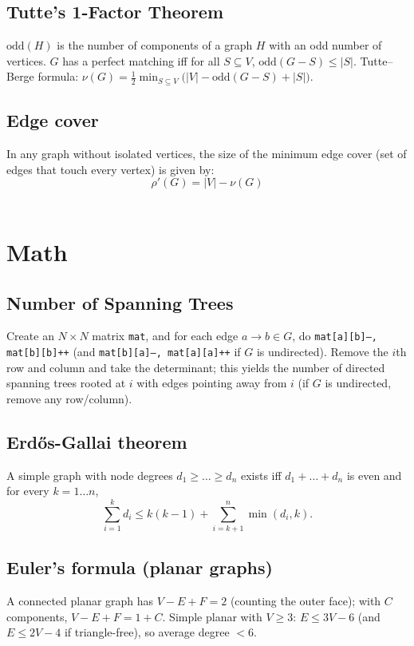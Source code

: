 	\subsection{Tutte's 1-Factor Theorem}
$\text{odd}(H)$ is the number of components of a graph $H$ with an odd number of vertices.
		$G$ has a perfect matching iff for all $S\subseteq V$, $\text{odd}(G-S)\le |S|$.
		Tutte--Berge formula: $\displaystyle \nu(G)=\tfrac12\min_{S\subseteq V}\big(|V|-\text{odd}(G-S)+|S|\big)$. \\

	\subsection{Edge cover}
		In any graph without isolated vertices, the size of the minimum edge cover (set of edges that touch every vertex) is given by: \[\rho'(G)=|V|-\nu(G)\] \\

\section{Math}
	\subsection{Number of Spanning Trees}
		Create an $N\times N$ matrix \texttt{mat}, and for each edge $a \rightarrow b \in G$, do
		\texttt{mat[a][b]---, mat[b][b]++} (and \texttt{mat[b][a]---, mat[a][a]++} if $G$ is undirected).
		Remove the $i$th row and column and take the determinant; this yields the number of directed spanning trees rooted at $i$ with edges pointing away from $i$
		(if $G$ is undirected, remove any row/column).

	\subsection{Erdős-Gallai theorem}
		A simple graph with node degrees $d_1 \ge \dots \ge d_n$ exists iff $d_1 + \dots + d_n$ is even and for every $k = 1\dots n$,
		\[ \sum _{i=1}^{k}d_{i}\leq k(k-1)+\sum _{i=k+1}^{n}\min(d_{i},k). \]

	\subsection{Euler's formula (planar graphs)}
		A connected planar graph has $V - E + F = 2$ (counting the outer face); with $C$ components, $V - E + F = 1 + C$.
		Simple planar with $V \ge 3$: $E \le 3V - 6$ (and $E \le 2V - 4$ if triangle-free), so average degree $< 6$.

